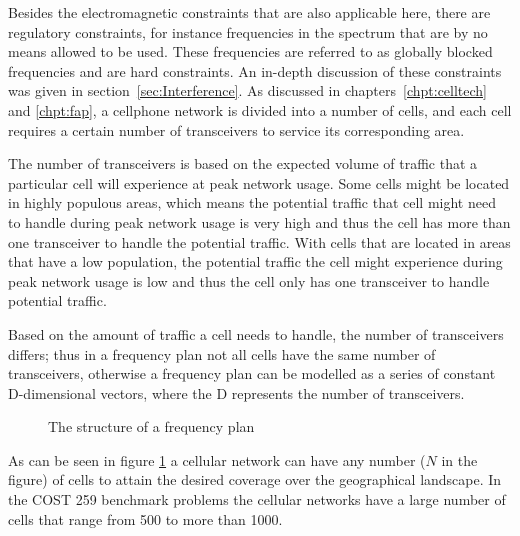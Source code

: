 Besides the electromagnetic constraints that are also applicable here, there are regulatory constraints, for instance frequencies in the spectrum that are by no means allowed to be used. These frequencies are referred to as globally blocked frequencies and are hard constraints. An in-depth discussion of these constraints was given in section~\ref{sec:Interference}. As discussed in chapters~\ref{chpt:celltech} and \ref{chpt:fap}, a cellphone network is divided into a number of cells, and each cell requires a certain number of transceivers to service its corresponding area. 

The number of transceivers is based on the expected volume of traffic that a particular cell will experience at peak network usage. Some cells might be located in highly populous areas, which means the potential traffic that cell might need to handle during peak network usage is very high and thus the cell has more than one transceiver to handle the potential traffic. With cells that are located in areas that have a low population, the potential traffic the cell might experience during peak network usage is low and thus the cell only has one transceiver to handle potential traffic.

Based on the amount of traffic a cell needs to handle, the number of transceivers differs; thus in a frequency plan not all cells have the same number of transceivers, otherwise a frequency plan can be modelled as a series of constant D-dimensional vectors, where the D represents the number of transceivers. 
\begin{figure}[ht]
	\centering
	\setlength \fboxsep{0pt}
	\setlength \fboxrule{0.5pt}
	\caption{The structure of a frequency plan}
	\label{fig:fapPlan}
\end{figure}
As can be seen in figure \ref{fig:fapPlan} a cellular network can have any number ($N$ in the figure) of cells to attain the desired coverage over the geographical landscape. In the COST 259 benchmark problems the cellular networks have a large number of cells that range from 500 to more than 1000. 

